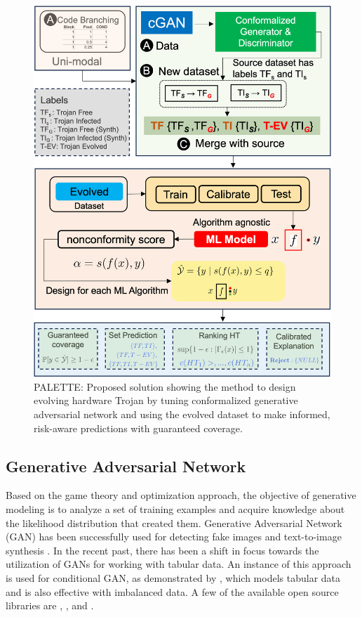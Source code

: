 \begin{figure}
  \centering
  \includegraphics[width=1\columnwidth]{figs/RV1.png}
  \caption{PALETTE: Proposed solution showing the method to design evolving hardware Trojan by tuning conformalized generative adversarial network and using the evolved dataset to make informed, risk-aware predictions with guaranteed coverage.}
  \label{fig:solution}
\end{figure}

\subsection*{Generative Adversarial Network} 
\label{sec:GAN}
Based on the game theory and optimization approach, the objective of generative modeling \cite{goodfellow2020generative} is to analyze a set of training examples and acquire knowledge about the likelihood distribution that created them. Generative Adversarial Network (GAN) has been successfully used for detecting fake images \cite{ojha2023towards} and text-to-image synthesis \cite{kang2023scaling}. In the recent past, there has been a shift in focus towards the utilization of GANs for working with tabular data. An instance of this approach is used for conditional GAN, as demonstrated by \cite{xu2019modeling}, which models tabular data and is also effective with imbalanced data. A few of the available open source libraries are \cite{ashrapov2020tabular}, \cite{lederrey2022datgan}, and \cite{zhao2023gtv}.

